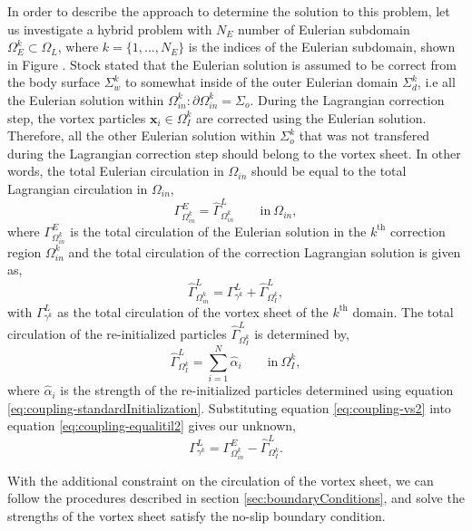 	In order to describe the approach to determine the solution to this problem, let us investigate a hybrid problem with $N_E$ number of Eulerian subdomain $\Omega_E^k\subset\Omega_L$, where $k=\{1,...,N_E\}$ is the indices of the Eulerian subdomain, shown in Figure . Stock \cite{Stock2010a} stated that the Eulerian solution is assumed to be correct from the body surface $\Sigma_w^k$ to somewhat inside of the outer Eulerian domain $\Sigma_d^k$, i.e all the Eulerian solution within $\Omega_{in}^k: \partial\Omega_{in}^k = \Sigma_o$. During the Lagrangian correction step, the vortex particles $\mathbf{x}_i\in\Omega_I^k$ are corrected using the Eulerian solution. Therefore, all the other Eulerian solution within $\Sigma_o^k$ that was not transfered during the Lagrangian correction step should belong to the vortex sheet. In other words, the total Eulerian circulation in $\Omega_{in}$ should be equal to the total Lagrangian circulation in $\Omega_{in}$,
		\begin{equation}
		\Gamma_{\Omega_{in}^k}^E = \hat{\Gamma}_{\Omega_{in}^k}^L \qquad \mathrm{in}\ \Omega_{in},
		\label{eq:coupling-equalitil2}
		\end{equation}	
	where $\Gamma_{\Omega_{in}^k}^E$ is the total circulation of the Eulerian solution in the $k^{\mathrm{th}}$ correction region $\Omega_{in}^k$ and the total circulation of the correction Lagrangian solution is given as,
		\begin{equation}
		\hat{\Gamma}_{\Omega_{in}^k}^L = \Gamma_{\gamma^k}^L + \hat{\Gamma}_{\Omega_{I}^k}^L,
		\label{eq:coupling-vs2}
		\end{equation}
	with $ \Gamma_{\gamma^k}^L$ as the total circulation of the vortex sheet of the $k^{\mathrm{th}}$ domain. The total circulation of the re-initialized particles $\hat{\Gamma}_{\Omega_{I}^k}^L$ is determined by,
		\begin{equation}
		\hat{\Gamma}_{\Omega_I^k}^L = \sum\limits_{i=1}^{N} \hat{\alpha}_i \qquad \mathrm{in}\ \Omega_I^k,
		\end{equation}
	where $\hat{\alpha}_i$ is the strength of the re-initialized particles determined using equation 		\ref{eq:coupling-standardInitialization}. Substituting equation \ref{eq:coupling-vs2} into equation \ref{eq:coupling-equalitil2} gives our unknown,
		\begin{equation}
		\Gamma_{\gamma^k}^L = \Gamma_{\Omega_{in}^k}^E - \hat{\Gamma}_{\Omega_{I}^k}^L.
		\end{equation} 
	
	With the additional constraint on the circulation of the vortex sheet, we can follow the procedures described in section \ref{sec:boundaryConditions}, and solve the strengths of the vortex sheet satisfy the no-slip boundary condition. 
	

